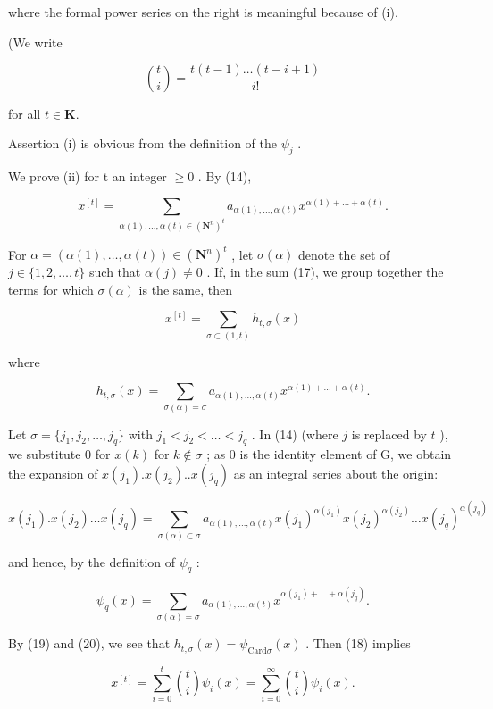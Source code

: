 where the formal power series on the right is meaningful because of (i).

(We write

\[
\binom {t} {i} = \frac {t (t - 1) \dots (t - i + 1)}{i !}
\]

for all \(t\in \mathbf{K}.\)

Assertion (i) is obvious from the definition of the \(\psi_{j}\) .

We prove (ii) for t an integer \(\geqslant0\) . By (14),

\[
x ^ {[ t ]} = \sum_ {\alpha (1),\ldots,\alpha (t)\in(\mathbf{N}^{n})^{t}} a _ {\alpha (1), \dots , \alpha (t)} x ^ {\alpha (1) + \dots + \alpha (t)}.\tag{17}
\]

For \(\alpha = (\alpha(1),\ldots,\alpha(t))\in(\mathbf{N}^{n})^{t}\) , let \(\sigma(\alpha)\) denote the set of \(j\in\{1,2,\ldots,t\}\) such that \(\alpha(j)\neq0\) . If, in the sum (17), we group together the terms for which \(\sigma(\alpha)\) is the same, then

\[
x ^ {[ t ]} = \sum_ {\sigma \subset (1, t)} h _ {t, \sigma} (x)\tag{18}
\]

where

\[
h _ {t, \sigma} (x) = \sum_ {\sigma (\alpha) = \sigma} a _ {\alpha (1), \dots , \alpha (t)} x ^ {\alpha (1) + \dots + \alpha (t)}.\tag{19}
\]

Let \(\sigma = \{j_1, j_2, \ldots, j_q\}\) with \(j_1 < j_2 < \ldots < j_q\) . In (14) (where \(j\) is replaced by \(t\) ), we substitute 0 for \(x(k)\) for \(k \notin \sigma\) ; as 0 is the identity element of G, we obtain the expansion of \(x(j_1).x(j_2)..x(j_q)\) as an integral series about the origin:

\[
x (j _ {1}). x (j _ {2}) \dots x (j _ {q}) = \sum_ {\sigma (\alpha) \subset \sigma} a _ {\alpha (1), \dots , \alpha (t)} x (j _ {1}) ^ {\alpha (j _ {1})} x (j _ {2}) ^ {\alpha (j _ {2})} \dots x (j _ {q}) ^ {\alpha (j _ {q})}
\]

and hence, by the definition of \(\psi_q\) :

\[
\psi_ {q} (x) = \sum_ {\sigma (\alpha) = \sigma} a _ {\alpha (1), \dots , \alpha (t)} x ^ {\alpha (j _ {1}) + \dots + \alpha (j _ {q})}.\tag{20}
\]

By (19) and (20), we see that \(h_{t,\sigma}(x) = \psi_{\mathrm{Card}\sigma}(x)\) . Then (18) implies

\[
x ^ {[ t ]} = \sum_ {i = 0} ^ {t} \binom {t} {i} \psi_ {i} (x) = \sum_ {i = 0} ^ {\infty} \binom {t} {i} \psi_ {i} (x).
\]

